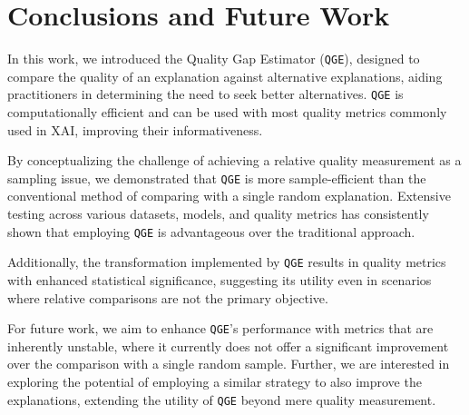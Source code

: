 \section{Conclusions and Future Work}
\label{sec:Conclusions}
In this work, we introduced the Quality Gap Estimator (\texttt{QGE}), designed to compare the quality of an explanation against alternative explanations, aiding practitioners in determining the need to seek better alternatives. \texttt{QGE} is computationally efficient and can be used with most quality metrics commonly used in XAI, improving their informativeness.

By conceptualizing the challenge of achieving a relative quality measurement as a sampling issue, we demonstrated that \texttt{QGE} is more sample-efficient than the conventional method of comparing with a single random explanation. Extensive testing across various datasets, models, and quality metrics has consistently shown that employing \texttt{QGE} is advantageous over the traditional approach.

Additionally, the transformation implemented by \texttt{QGE} results in quality metrics with enhanced statistical significance, suggesting its utility even in scenarios where relative comparisons are not the primary objective.

For future work, we aim to enhance \texttt{QGE}'s performance with metrics that are inherently unstable, where it currently does not offer a significant improvement over the comparison with a single random sample. Further, we are interested in exploring the potential of employing a similar strategy to also improve the explanations, extending the utility of \texttt{QGE} beyond mere quality measurement.